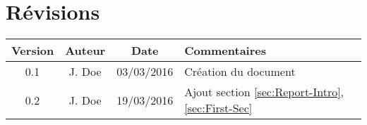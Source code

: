 \section*{Révisions}
\begin{center}
\begin{tabular}{|c|c|c|p{5.8cm}|}
\hline 
{\bf Version} 	& {\bf Auteur} 			& {\bf Date} 	& {\bf Commentaires} \\ 
\hline
\hline
0.1 			& J. {\sc Doe} 		& 03/03/2016 	& Création du document \\ 
\hline 
0.2				& J. {\sc Doe} 		& 19/03/2016 	& Ajout section \ref{sec:Report-Intro}, \ref{sec:First-Sec}\\ 
\hline
\end{tabular}
\end{center}
\newpage